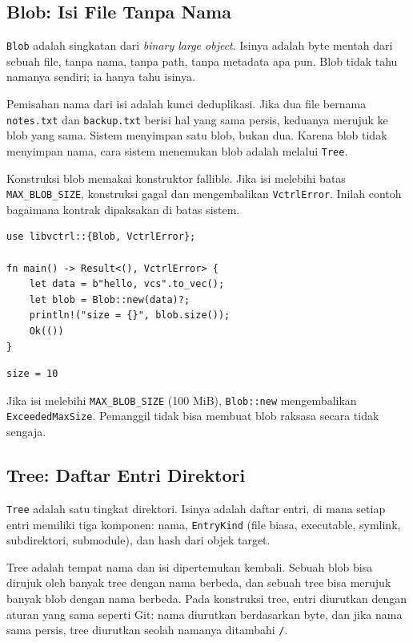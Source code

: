\documentclass[11pt,a4paper]{article}
\begin{document}
\subsection{Blob: Isi File Tanpa Nama}

\texttt{Blob} adalah singkatan dari \textit{binary large object}. Isinya adalah byte mentah dari sebuah file, tanpa nama, tanpa path, tanpa metadata apa pun. Blob tidak tahu namanya sendiri; ia hanya tahu isinya.

Pemisahan nama dari isi adalah kunci deduplikasi. Jika dua file bernama \texttt{notes.txt} dan \texttt{backup.txt} berisi hal yang sama persis, keduanya merujuk ke blob yang sama. Sistem menyimpan satu blob, bukan dua. Karena blob tidak menyimpan nama, cara sistem menemukan blob adalah melalui \texttt{Tree}.

Konstruksi blob memakai konstruktor fallible. Jika isi melebihi batas \texttt{MAX\_BLOB\_SIZE}, konstruksi gagal dan mengembalikan \texttt{VctrlError}. Inilah contoh bagaimana kontrak dipaksakan di batas sistem.

\begin{lstlisting}[style=code]
use libvctrl::{Blob, VctrlError};

fn main() -> Result<(), VctrlError> {
    let data = b"hello, vcs".to_vec();
    let blob = Blob::new(data)?;
    println!("size = {}", blob.size());
    Ok(())
}
\end{lstlisting}

\begin{lstlisting}[style=out]
size = 10
\end{lstlisting}

Jika isi melebihi \texttt{MAX\_BLOB\_SIZE} (100 MiB), \texttt{Blob::new} mengembalikan \texttt{ExceededMaxSize}. Pemanggil tidak bisa membuat blob raksasa secara tidak sengaja.

\subsection{Tree: Daftar Entri Direktori}

\texttt{Tree} adalah satu tingkat direktori. Isinya adalah daftar entri, di mana setiap entri memiliki tiga komponen: nama, \texttt{EntryKind} (file biasa, executable, symlink, subdirektori, submodule), dan hash dari objek target.

Tree adalah tempat nama dan isi dipertemukan kembali. Sebuah blob bisa dirujuk oleh banyak tree dengan nama berbeda, dan sebuah tree bisa merujuk banyak blob dengan nama berbeda. Pada konstruksi tree, entri diurutkan dengan aturan yang sama seperti Git: nama diurutkan berdasarkan byte, dan jika nama sama persis, tree diurutkan seolah namanya ditambahi \texttt{/}.
\end{document}
